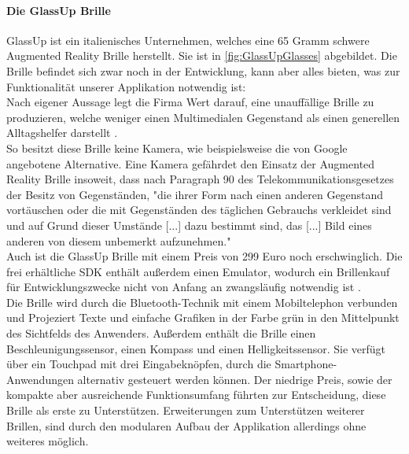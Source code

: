 \paragraph{Die GlassUp Brille}
GlassUp ist ein italienisches Unternehmen, welches eine 65 Gramm \cite{glassup_faq_2017} schwere Augmented Reality Brille herstellt. Sie ist in \ref{fig:GlassUpGlasses} abgebildet. Die Brille befindet sich zwar noch in der Entwicklung, kann aber alles bieten, was zur Funktionalität unserer Applikation notwendig ist:\\
Nach eigener Aussage legt die Firma Wert darauf, eine unauffällige Brille zu produzieren, welche weniger einen Multimedialen Gegenstand als einen generellen Alltagshelfer darstellt \cite{glassup_home_2017}.\\
So besitzt diese Brille keine Kamera, wie beispielsweise die von Google angebotene Alternative\cite{google_glassescamera_2017}. Eine Kamera gefährdet den Einsatz der Augmented Reality Brille insoweit, dass nach Paragraph 90 des Telekommunikationsgesetzes der Besitz von Gegenständen, "die ihrer Form nach einen anderen Gegenstand vortäuschen oder die mit Gegenständen des täglichen Gebrauchs verkleidet sind und auf Grund dieser Umstände [...] dazu bestimmt sind, das [...] Bild eines anderen von diesem unbemerkt aufzunehmen."\\
Auch ist die GlassUp Brille mit einem Preis von 299 Euro \cite{glassup_faq_2017} noch erschwinglich. Die frei erhältliche SDK enthält außerdem einen Emulator, wodurch ein Brillenkauf für Entwicklungszwecke nicht von Anfang an zwangsläufig notwendig ist \cite{glassup_sdk_2017}.\\
Die Brille wird durch die Bluetooth-Technik mit einem Mobiltelephon verbunden und Projeziert Texte und einfache Grafiken in der Farbe grün in den Mittelpunkt des Sichtfelds des Anwenders. Außerdem enthält die Brille einen Beschleunigungssensor, einen Kompass und einen Helligkeitssensor\cite{glassup_devguide_2015}.
Sie verfügt über ein Touchpad mit drei Eingabeknöpfen, durch die Smartphone-Anwendungen alternativ gesteuert werden können\cite{glassup_devguide_2015}.
Der niedrige Preis, sowie der kompakte aber ausreichende Funktionsumfang führten zur Entscheidung, diese Brille als erste zu Unterstützen. Erweiterungen zum Unterstützen weiterer Brillen, sind durch den modularen Aufbau der Applikation allerdings ohne weiteres möglich.

